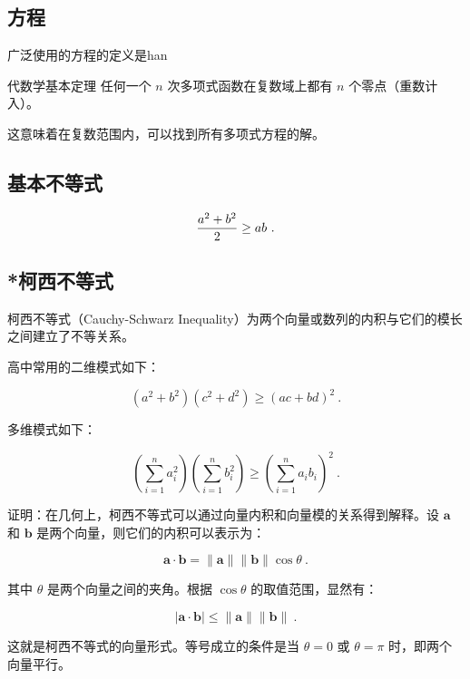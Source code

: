 
\begin{issues}
\issueDraft
\end{issues}

\subsection{方程}

广泛使用的方程的定义是han


\begin{definition}{代数学基本定理}
任何一个 $n$ 次多项式函数在复数域上都有 $n$ 个零点（重数计入）。
\end{definition}
这意味着在复数范围内，可以找到所有多项式方程的解。

\subsection{基本不等式}

\begin{equation}
{a^2+b^2\over2}\geq ab~.
\end{equation}

\subsection{*柯西不等式}

柯西不等式（Cauchy-Schwarz Inequality）为两个向量或数列的内积与它们的模长之间建立了不等关系。

高中常用的二维模式如下：

\begin{equation}
\left( a^2 + b^2\right) \left(c^2 + d^2 \right) \geq \left( ac+bd \right)^2~.
\end{equation}

多维模式如下：

\begin{equation}
\left( \sum_{i=1}^{n} a_i^2 \right) \left( \sum_{i=1}^{n} b_i^2 \right) \geq \left( \sum_{i=1}^{n} a_i b_i \right)^2~.
\end{equation}

证明：在几何上，柯西不等式可以通过向量内积和向量模的关系得到解释。设 $\mathbf{a}$ 和 $\mathbf{b}$ 是两个向量，则它们的内积可以表示为：

$$\mathbf{a} \cdot \mathbf{b} = \|\mathbf{a}\| \|\mathbf{b}\| \cos \theta~.$$

其中 $\theta$ 是两个向量之间的夹角。根据 $\cos \theta$ 的取值范围，显然有：

$$|\mathbf{a} \cdot \mathbf{b}| \leq \|\mathbf{a}\| \|\mathbf{b}\|~.$$

这就是柯西不等式的向量形式。等号成立的条件是当 $\theta = 0$ 或 $\theta = \pi$ 时，即两个向量平行。
